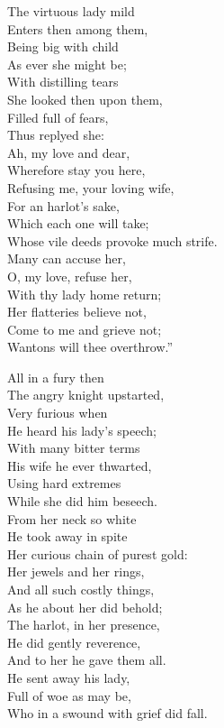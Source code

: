 \begin{dcverse}
\begin{patverse}
The virtuous lady mild\\
Enters then among them,\\
Being big with child\\
As ever she might be;\\
With distilling tears\\
She looked then upon them,\\
Filled full of fears,\\
Thus replyed she:\\
Ah, my love and dear,\\
Wherefore stay you here,\\
Refusing me, your loving wife,\\
For an harlot’s sake,\\
Which each one will take;\\
Whose vile deeds provoke much strife.\\
Many can accuse her,\\
O, my love, refuse her,\\
With thy lady home return;\\
Her flatteries believe not,\\
Come to me and grieve not;\\
Wantons will thee overthrow.”
\end{patverse}

\begin{patverse}
All in a fury then\\
The angry knight upstarted,\\
Very furious when\\
He heard his lady’s speech;\\
With many bitter terms\\
His wife he ever thwarted,\\
Using hard extremes\\
While she did him beseech.\\
From her neck so white\\
He took away in spite\\
Her curious chain of purest gold:\\
Her jewels and her rings,\\
And all such costly things,\\
As he about her did behold;\\
The harlot, in her presence,\\
He did gently reverence,\\
And to her he gave them all.\\
He sent away his lady,\\
Full of woe as may be,\\
Who in a swound with grief did fall.
\end{patverse}


\end{dcverse}

